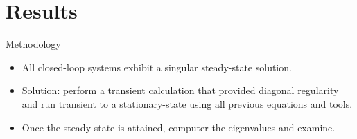 \documentclass[10pt,t,xcolor=table,compress]{UWMadBeamer}
\begin{document}
    \section{Results}
    \begin{frame}{Methodology}
    \begin{itemize}
        \item All closed-loop systems exhibit a singular steady-state solution.
        \item Solution: perform a transient calculation that provided diagonal regularity and run transient to a stationary-state using all previous equations and tools.
        \item Once the steady-state is attained, computer the eigenvalues and examine.
    \end{itemize}
    \end{frame}
\end{document}
